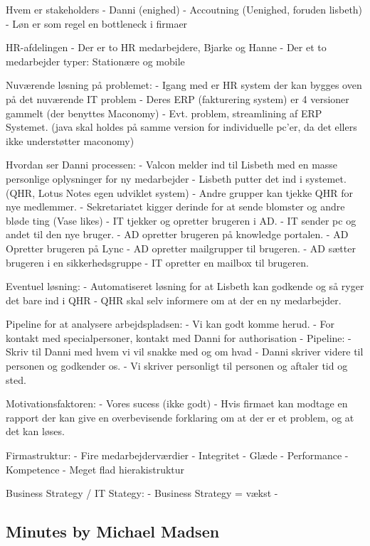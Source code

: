 Hvem er stakeholders
	- Danni (enighed)
	- Accoutning (Uenighed, foruden lisbeth)
	- Løn er som regel en bottleneck i firmaer

HR-afdelingen
	- Der er to HR medarbejdere, Bjarke og Hanne
	- Der et to medarbejder typer: Stationære og mobile

Nuværende løsning på problemet:
	- Igang med er HR system der kan bygges oven på det nuværende IT problem
	- Deres ERP (fakturering system) er 4 versioner gammelt (der benyttes Maconomy)
	- Evt. problem, streamlining af ERP Systemet. (java skal holdes på samme version for individuelle pc'er, da det ellers ikke understøtter maconomy)

Hvordan ser Danni processen:
	- Valcon melder ind til Lisbeth med en masse personlige oplysninger for ny medarbejder
	- Lisbeth putter det ind i systemet. (QHR, Lotus Notes egen udviklet system)
	- Andre grupper kan tjekke QHR for nye medlemmer.
		- Sekretariatet kigger derinde for at sende blomster og andre bløde ting (Vase likes)
		- IT tjekker og opretter brugeren i AD.
		- IT sender pc og andet til den nye bruger.
	- AD opretter brugeren på knowledge portalen.
	- AD Opretter brugeren på Lync
	- AD opretter mailgrupper til brugeren.
	- AD sætter brugeren i en sikkerhedsgruppe
	- IT opretter en mailbox til brugeren.

Eventuel løsning:
	- Automatiseret løsning for at Lisbeth kan godkende og så ryger det bare ind i QHR
	- QHR skal selv informere om at der en ny medarbejder.


Pipeline for at analysere arbejdspladsen:
	- Vi kan godt komme herud.
	- For kontakt med specialpersoner, kontakt med Danni for authorisation
	- Pipeline:
		- Skriv til Danni med hvem vi vil snakke med og om hvad
		- Danni skriver videre til personen og godkender os.
		- Vi skriver personligt til personen og aftaler tid og sted.

Motivationsfaktoren:
	- Vores sucess (ikke godt)
	- Hvis firmaet kan modtage en rapport der kan give en overbevisende forklaring om at der er et problem, og at det kan løses.


Firmastruktur:
	- Fire medarbejderværdier
		- Integritet
		- Glæde
		- Performance
		- Kompetence
	- Meget flad hierakistruktur


Business Strategy / IT Stategy:
	- Business Strategy = vækst
	- 

\subsection{Minutes by Michael Madsen}

